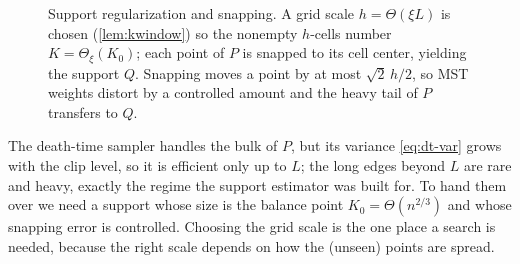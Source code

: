\begin{figure}[t]
\centering
{}
\caption{Support regularization and snapping. A grid scale $h=\Theta(\xi L)$ is chosen
(\cref{lem:kwindow}) so the nonempty $h$-cells number $K=\Theta_\xi(K_0)$; each point of $P$ is snapped to its
cell center, yielding the support $Q$. Snapping moves a point by at most $\sqrt2\,h/2$, so MST weights
distort by a controlled amount and the heavy tail of $P$ transfers to $Q$.}
\label{fig:snap}
\end{figure}

The death-time sampler handles the bulk of $P$, but its variance \eqref{eq:dt-var} grows with the clip
level, so it is efficient only up to $L$; the long edges beyond $L$ are rare and heavy, exactly the regime
the support estimator was built for. To hand them over we need a support whose size is the balance point
$K_0=\Theta(n^{2/3})$ and whose snapping error is controlled. Choosing the grid scale is the one place a
search is needed, because the right scale depends on how the (unseen) points are spread.

